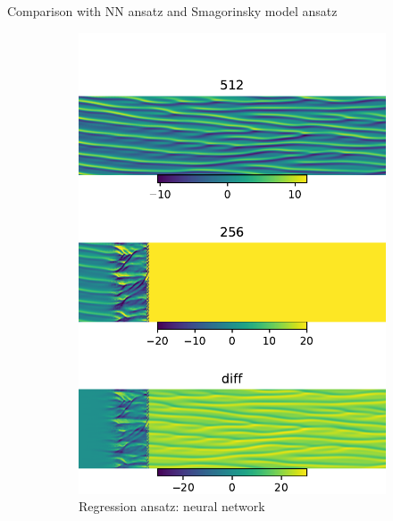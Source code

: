 \documentclass[aspectratio=169]{beamer}
\begin{document}
\begin{frame}{Comparison with NN ansatz and Smagorinsky model ansatz}
	\begin{figure}[ht]
		\centering
		\begin{subfigure}[b]{0.32\textwidth}
			\centering 
			\includegraphics[width=\textwidth]
			{fig/ks_nu0.1_N1512N2256_correct_cmp_lr1e-4.pdf} 
			\caption{Regression ansatz: neural network} 
		\end{subfigure}
		\begin{subfigure}[b]{0.32\textwidth}
			\centering 

\end{subfigure}
\end{figure}
\end{frame}
\end{document}

